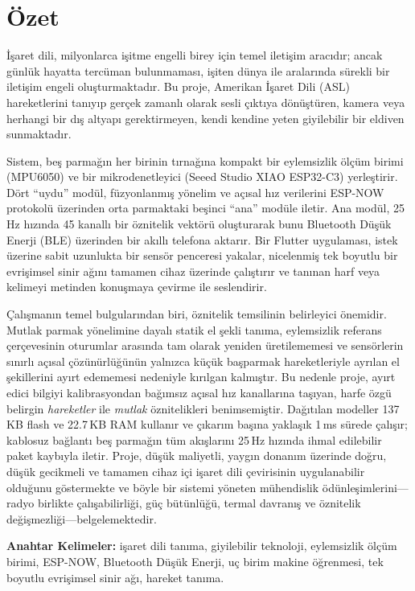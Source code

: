 \chapter*{Özet}

İşaret dili, milyonlarca işitme engelli birey için temel iletişim aracıdır;
ancak günlük hayatta tercüman bulunmaması, işiten dünya ile aralarında sürekli
bir iletişim engeli oluşturmaktadır. Bu proje, Amerikan İşaret Dili (ASL)
hareketlerini tanıyıp gerçek zamanlı olarak sesli çıktıya dönüştüren, kamera
veya herhangi bir dış altyapı gerektirmeyen, kendi kendine yeten giyilebilir
bir eldiven sunmaktadır.

Sistem, beş parmağın her birinin tırnağına kompakt bir eylemsizlik ölçüm
birimi (MPU6050) ve bir mikrodenetleyici (Seeed Studio XIAO ESP32-C3)
yerleştirir. Dört ``uydu'' modül, füzyonlanmış yönelim ve açısal hız
verilerini ESP-NOW protokolü üzerinden orta parmaktaki beşinci ``ana'' modüle
iletir. Ana modül, 25\,Hz hızında 45 kanallı bir öznitelik vektörü oluşturarak
bunu Bluetooth Düşük Enerji (BLE) üzerinden bir akıllı telefona aktarır. Bir
Flutter uygulaması, istek üzerine sabit uzunlukta bir sensör penceresi
yakalar, nicelenmiş tek boyutlu bir evrişimsel sinir ağını tamamen cihaz
üzerinde çalıştırır ve tanınan harf veya kelimeyi metinden konuşmaya çevirme
ile seslendirir.

Çalışmanın temel bulgularından biri, öznitelik temsilinin belirleyici
önemidir. Mutlak parmak yönelimine dayalı statik el şekli tanıma, eylemsizlik
referans çerçevesinin oturumlar arasında tam olarak yeniden üretilememesi ve
sensörlerin sınırlı açısal çözünürlüğünün yalnızca küçük başparmak
hareketleriyle ayrılan el şekillerini ayırt edememesi nedeniyle kırılgan
kalmıştır. Bu nedenle proje, ayırt edici bilgiyi kalibrasyondan bağımsız
açısal hız kanallarına taşıyan, harfe özgü belirgin \emph{hareketler} ile
\emph{mutlak} öznitelikleri benimsemiştir. Dağıtılan modeller 137\,KB flash ve
22.7\,KB RAM kullanır ve çıkarım başına yaklaşık 1\,ms sürede çalışır; kablosuz
bağlantı beş parmağın tüm akışlarını 25\,Hz hızında ihmal edilebilir paket
kaybıyla iletir. Proje, düşük maliyetli, yaygın donanım üzerinde doğru, düşük
gecikmeli ve tamamen cihaz içi işaret dili çevirisinin uygulanabilir olduğunu
göstermekte ve böyle bir sistemi yöneten mühendislik ödünleşimlerini—radyo
birlikte çalışabilirliği, güç bütünlüğü, termal davranış ve öznitelik
değişmezliği—belgelemektedir.

\vfill
\textbf{Anahtar Kelimeler:} işaret dili tanıma, giyilebilir teknoloji,
eylemsizlik ölçüm birimi, ESP-NOW, Bluetooth Düşük Enerji, uç birim makine
öğrenmesi, tek boyutlu evrişimsel sinir ağı, hareket tanıma.
\clearpage
